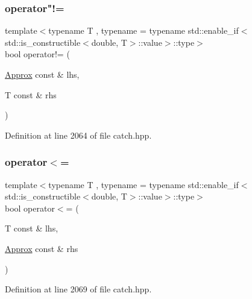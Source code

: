\subsubsection{\texorpdfstring{operator"!=}{operator!=}\hspace{0.1cm}{\footnotesize\ttfamily [2/2]}}
{\footnotesize\ttfamily template$<$typename T , typename  = typename std\+::enable\+\_\+if$<$std\+::is\+\_\+constructible$<$double, T$>$\+::value$>$\+::type$>$ \\
bool operator!= (\begin{DoxyParamCaption}\item[{\mbox{\hyperlink{class_catch_1_1_detail_1_1_approx}{Approx}} const \&}]{lhs,  }\item[{T const \&}]{rhs }\end{DoxyParamCaption})\hspace{0.3cm}{\ttfamily [friend]}}



Definition at line 2064 of file catch.\+hpp.

\mbox{\label{class_catch_1_1_detail_1_1_approx_a0369de03e81bc2ceaf6c9d830476bd49}} 
\subsubsection{\texorpdfstring{operator$<$=}{operator<=}\hspace{0.1cm}{\footnotesize\ttfamily [1/2]}}
{\footnotesize\ttfamily template$<$typename T , typename  = typename std\+::enable\+\_\+if$<$std\+::is\+\_\+constructible$<$double, T$>$\+::value$>$\+::type$>$ \\
bool operator$<$= (\begin{DoxyParamCaption}\item[{T const \&}]{lhs,  }\item[{\mbox{\hyperlink{class_catch_1_1_detail_1_1_approx}{Approx}} const \&}]{rhs }\end{DoxyParamCaption})\hspace{0.3cm}{\ttfamily [friend]}}



Definition at line 2069 of file catch.\+hpp.

\mbox{\label{class_catch_1_1_detail_1_1_approx_a6040b908588745570847d7ae8483b091}} 
